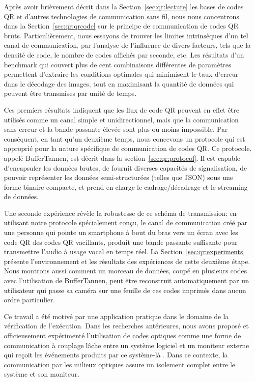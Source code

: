 Après avoir brièvement décrit dans la Section~\ref{sec:qr:lecture} les bases de codes QR et d'autres technologies de communication sans fil, nous nous concentrons dans la Section~\ref{sec:qr:qrcode} sur le principe de communication de codes QR bruts. Particulièrement, nous essayons de trouver les limites intrinsèques d'un tel canal de communication, par l'analyse de l'influence de divers facteurs, tels que la densité de code, le nombre de codes affichés par seconde, etc. Les résultats d'un benchmark qui couvert plus de cent combinaisons différentes de paramètres permettent d'extraire les conditions optimales qui minimisent le taux d'erreur dans le décodage des images, tout en maximisant la quantité de données qui peuvent être transmises par unité de temps.

Ces premiers résultats indiquent que les flux de code QR peuvent en effet être utilisés comme un canal simple et unidirectionnel, mais que la communication sans erreur et la bande passante élevée sont plus ou moins impossible. Par conséquent, en tant qu'un deuxième temps, nous concevons un protocole qui est approprié pour la nature spécifique de communication de codes QR. Ce protocole, appelé BufferTannen, est décrit dans la section~\ref{sec:qr:protocol}. Il est capable d'encapsuler les données brutes, de fournit diverses capacités de signalisation, de pouvoir représenter les données semi-structurées (telles que JSON) sous une forme binaire compacte, et prend en charge le cadrage/décadrage et le streaming de données.

Une seconde expérience révèle la robustesse de ce schéma de transmission: en utilisant notre protocole spécialement conçu, le canal de communication créé par une personne qui pointe un smartphone à bout du bras vers un écran avec les code QR des codes QR vacillants, produit une bande passante suffisante pour transmettre l'audio à usage vocal en temps réel. La Section~\ref{sec:qr:experiments} présente l'environnement et les résultats des expériences de cette deuxième étape. Nous montrons aussi comment un morceau de données, coupé en plusieurs codes avec l'utilisation de BufferTannen, peut être reconstruit automatiquement par un utilisateur qui passe sa caméra sur une feuille de ces codes imprimés dans aucun ordre particulier.

Ce travail a été motivé par une application pratique dans le domaine de la vérification de l'exécution. Dans les recherches antérieures, nous avons proposé et officieusement expérimenté l'utilisation de codes optiques comme une forme de communication à couplage lâche entre un système logiciel et un moniteur externe qui reçoit les événements produits par ce système-là \citep{DBLP_conf/rv/LavoieLVGH14}. Dans ce contexte, la communication par les milieux optiques assure un isolement complet entre le système et son moniteur.

